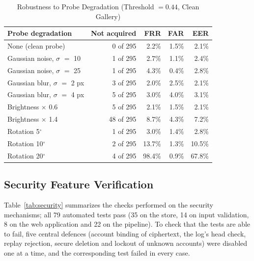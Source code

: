 \documentclass[conference]{IEEEtran}
\begin{document}
\begin{table}[!t]
\caption{Robustness to Probe Degradation (Threshold $= 0.44$, Clean Gallery)}
\label{tab:robust}
\centering\footnotesize
\begin{tabular}{lrrrr}
\toprule
\textbf{Probe degradation} & \textbf{Not acquired} & \textbf{FRR} & \textbf{FAR} & \textbf{EER} \\
\midrule
None (clean probe) & 0 of 295 & 2.2\% & 1.5\% & 2.1\% \\
Gaussian noise, $\sigma$ $=$ 10 & 1 of 295 & 2.7\% & 1.1\% & 2.4\% \\
Gaussian noise, $\sigma$ $=$ 25 & 1 of 295 & 4.3\% & 0.4\% & 2.8\% \\
Gaussian blur, $\sigma$ $=$ 2 px & 3 of 295 & 2.0\% & 2.5\% & 2.1\% \\
Gaussian blur, $\sigma$ $=$ 4 px & 5 of 295 & 3.0\% & 4.0\% & 3.1\% \\
Brightness $\times$ 0.6 & 5 of 295 & 2.1\% & 1.5\% & 2.1\% \\
Brightness $\times$ 1.4 & 48 of 295 & 8.7\% & 4.3\% & 7.2\% \\
Rotation 5$^\circ$ & 1 of 295 & 3.0\% & 1.4\% & 2.8\% \\
Rotation 10$^\circ$ & 2 of 295 & 13.7\% & 1.3\% & 10.5\% \\
Rotation 20$^\circ$ & 4 of 295 & 98.4\% & 0.9\% & 67.8\% \\
\bottomrule
\end{tabular}
\end{table}


\subsection{Security Feature Verification}
Table~\ref{tab:security} summarizes the checks performed on the security mechanisms; all 79 automated tests pass (35 on the store, 14 on input validation, 8 on the web application and 22 on the pipeline). To check that the tests are able to fail, five central defences (account binding of ciphertext, the log's head check, replay rejection, secure deletion and lockout of unknown accounts) were disabled one at a time, and the corresponding test failed in every case.
\end{document}
